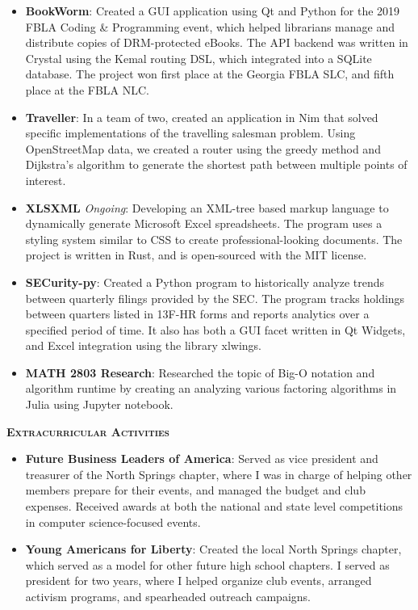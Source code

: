 \documentclass{article}
\begin{document}
  \begin{itemize}
    \item \textbf{BookWorm}: Created a GUI application using Qt and Python for the 2019 FBLA Coding \& Programming event, which helped librarians manage and distribute copies of DRM-protected eBooks. The API backend was written in Crystal using the Kemal routing DSL, which integrated into a SQLite database. The project won first place at the Georgia FBLA SLC, and fifth place at the FBLA NLC.
    \item \textbf{Traveller}: In a team of two, created an application in Nim that solved specific implementations of the travelling salesman problem. Using OpenStreetMap data, we created a router using the greedy method and Dijkstra's algorithm to generate the shortest path between multiple points of interest.
    \item \textbf{XLSXML} {\footnotesize \textit{Ongoing}}: Developing an XML-tree based markup language to dynamically generate Microsoft Excel spreadsheets. The program uses a styling system similar to CSS to create professional-looking documents. The project is written in Rust, and is open-sourced with the MIT license.
    \item \textbf{SECurity-py}: Created a Python program to historically analyze trends between quarterly filings provided by the SEC. The program tracks holdings between quarters listed in 13F-HR forms and reports analytics over a specified period of time. It also has both a GUI facet written in Qt Widgets, and Excel integration using the library xlwings.
    \item \textbf{MATH 2803 Research}: Researched the topic of Big-O notation and algorithm runtime by creating an analyzing various factoring algorithms in Julia using Jupyter notebook.
  \end{itemize}

  \vspace{10pt}

  {\large \textbf{\textsc{Extracurricular Activities}}}\hspace{5pt}\xrfill[.5ex]{.4pt}

  \vspace{3pt}

  \begin{itemize}
    \item \textbf{Future Business Leaders of America}: Served as vice president and treasurer of the North Springs chapter, where I was in charge of helping other members prepare for their events, and managed the budget and club expenses. Received awards at both the national and state level competitions in computer science-focused events.
    \item \textbf{Young Americans for Liberty}: Created the local North Springs chapter, which served as a model for other future high school chapters. I served as president for two years, where I helped organize club events, arranged activism programs, and spearheaded outreach campaigns.
  \end{itemize}
\end{document}
